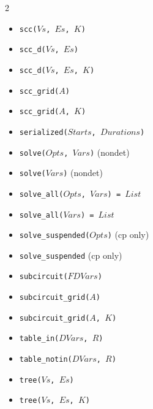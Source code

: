 \documentclass[10pt]{article}
\begin{document}
\begin{multicols}{2}
\begin{scriptsize}
\begin{itemize}
\item \texttt{scc($Vs$, $Es$, $K$)}
\item \texttt{scc\_d($Vs$, $Es$)}
\item \texttt{scc\_d($Vs$, $Es$, $K$)}
\item \texttt{scc\_grid($A$)}
\item \texttt{scc\_grid($A$, $K$)}
\item \texttt{serialized($Starts$, $Durations$)}
\item \texttt{solve($Opts$, $Vars$)} (nondet)
\item \texttt{solve($Vars$)} (nondet)
\item \texttt{solve\_all($Opts$, $Vars$) = $List$}
\item \texttt{solve\_all($Vars$) = $List$}
\item \texttt{solve\_suspended($Opts$)} (cp only)
\item \texttt{solve\_suspended} (cp only)
\item \texttt{subcircuit($FDVars$)}
\item \texttt{subcircuit\_grid($A$)}
\item \texttt{subcircuit\_grid($A$, $K$)}
\item \texttt{table\_in($DVars$, $R$)}
\item \texttt{table\_notin($DVars$, $R$)}
\item \texttt{tree($Vs$, $Es$)}
\item \texttt{tree($Vs$, $Es$, $K$)}

\end{itemize}
\end{scriptsize}

\end{multicols}
\end{document}
